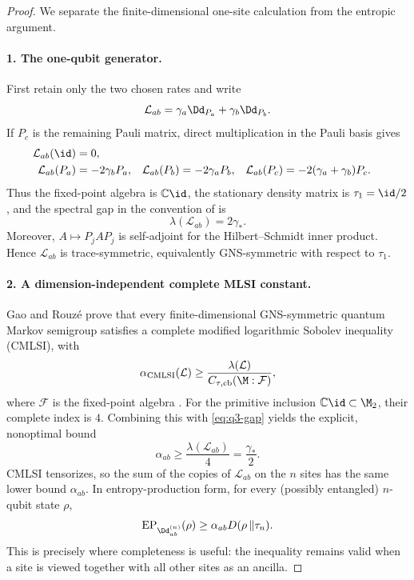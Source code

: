 \documentclass[class=article,11pt,a4paper,crop=false]{standalone}
\begin{document}
\begin{proof}
We separate the finite-dimensional one-site calculation from the entropic
argument.

\paragraph{1. The one-qubit generator.}
First retain only the two chosen rates and write
\[
 \mathcal L_{ab}=\gamma_a\Dd_{P_a}+\gamma_b\Dd_{P_b}.
\]
If $P_c$ is the remaining Pauli matrix, direct multiplication in the Pauli
basis gives
\begin{align}
 \mathcal L_{ab}(\id)&=0,\nonumber\\
 \mathcal L_{ab}(P_a)&=-2\gamma_bP_a,&
 \mathcal L_{ab}(P_b)&=-2\gamma_aP_b,&
 \mathcal L_{ab}(P_c)&=-2(\gamma_a+\gamma_b)P_c.
 \label{eq:q3-pauli-spectrum}
\end{align}
Thus the fixed-point algebra is $\mathbb C\id$, the stationary density matrix
is $\tau_1=\id/2$, and the spectral gap in the convention of
\cite{GaoRouze2022Complete} is
\begin{equation}\label{eq:q3-gap}
 \lambda(\mathcal L_{ab})=2\gamma_*.
\end{equation}
Moreover, $A\mapsto P_jAP_j$ is self-adjoint for the Hilbert--Schmidt inner
product. Hence $\mathcal L_{ab}$ is trace-symmetric, equivalently GNS-symmetric with
respect to $\tau_1$.

\paragraph{2. A dimension-independent complete MLSI constant.}
Gao and Rouz\'e prove that every finite-dimensional GNS-symmetric quantum
Markov semigroup satisfies a complete modified logarithmic Sobolev inequality
(CMLSI), with
\[
 \alpha_{\rm CMLSI}(\mathcal L)
 \ge \frac{\lambda(\mathcal L)}{C_{\tau,\mathrm{cb}}(\M:\mathcal F)},
\]
where $\mathcal F$ is the fixed-point algebra
\cite[Theorems~1.1 and~3.3]{GaoRouze2022Complete}. For the primitive inclusion
$\mathbb C\id\subset\M_2$, their complete index is $4$. Combining this with
\eqref{eq:q3-gap} yields the explicit, nonoptimal bound
\begin{equation}\label{eq:q3-alpha}
 \alpha_{ab}\ge\frac{\lambda(\mathcal L_{ab})}{4}
 =\frac{\gamma_*}{2}.
\end{equation}
CMLSI tensorizes, so the sum of the copies of $\mathcal L_{ab}$ on the $n$ sites has
the same lower bound $\alpha_{ab}$. In entropy-production form, for every
(possibly entangled) $n$-qubit state $\rho$,
\begin{equation}\label{eq:q3-cmlsi}
 \operatorname{EP}_{\Dd^{(n)}_{ab}}(\rho)
 \ge \alpha_{ab}D(\rho\,\| \tau_n).
\end{equation}
This is precisely where completeness is useful: the inequality remains valid
when a site is viewed together with all other sites as an ancilla.


\end{proof}
\end{document}
